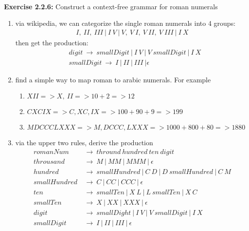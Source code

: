 \documentclass{article}
\begin{document}
\textbf{Exercise 2.2.6:}
Construct a context-free grammar for roman numerals
\begin{enumerate}[label=\textbullet]
	\item via wikipedia, we can categorize the single roman numerals into 4 groups:
	\begin{align*}
		I,\ II,\ III\ |\ I\ V\ |\ V,\ V\ I,\ V\ II,\ V\ III\ |\ I\ X
	\end{align*}
	then get the production:
	\begin{align*}
		&digit\ \rightarrow\ smallDigit\ |\ I\ V\ |\ V\ smallDigit\ |\ I\ X\\
		&smallDigit\ \rightarrow\ I\ |\ II\ |\ III\ | \epsilon
	\end{align*}
	
	\item find a simple way to map roman to arabic numerals. For example
	\begin{enumerate}
		\item $XII => X,\ II => 10 + 2 => 12$
		\item $CXCIX => C,XC,IX => 100 + 90 + 9 => 199$
		\item $MDCCCLXXX => M, DCCC, LXXX => 1000 + 800 + 80 => 1880$
	\end{enumerate}
	
	\item via the upper two rules, derive the production
	\begin{align*}
	romanNum\ &\rightarrow\ thround\ hundred\ ten\ digit\\
	throusand\ &\rightarrow\ M\ |\ MM\ |\ MMM\ |\ \epsilon\\
	hundred\ &\rightarrow\ smallHundred\ |\ C\ D\ |\ D\ smallHundred\ |\ C\ M\\
	smallHundred\ &\rightarrow\ C\ |\ CC\ |\ CCC\ |\ \epsilon\\
	ten\ &\rightarrow\ smallTen\ |\ X\ L\ |\ L\ smallTen\ |\ X\ C\\
	smallTen\ &\rightarrow\ X\ |\ XX\ |\ XXX\ |\ \epsilon\\
	digit\ &\rightarrow\ smallDight\ |\ I\ V\ |\ V\ smallDigit\ |\ I\ X\\
	smallDigit\ &\rightarrow\ I\ |\ II\ |\ III\ |\ \epsilon
	\end{align*}
\end{enumerate}
\end{document}
